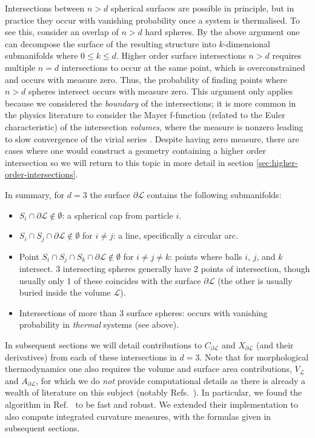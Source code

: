 \documentclass[11pt,twoside]{report}
\begin{document}
Intersections between $n > d$ spherical surfaces are possible in principle, but in practice they occur with vanishing probability once a system is thermalised.
To see this, consider an overlap of $n > d$ hard spheres.
By the above argument one can decompose the surface of the resulting structure into $k$-dimensional submanifolds where $0 \le k \le d$.
Higher order surface intersections $n>d$ requires multiple $n=d$ intersections to occur at the same point, which is overconstrained and occurs with measure zero.
Thus, the probability of finding points where $n > d$ spheres intersect occurs with measure zero.
This argument only applies because we considered the \emph{boundary} of the intersections; it is more common in the physics literature to consider the Mayer f-function (related to the Euler characteristic) of the intersection \emph{volumes}, where the measure is nonzero leading to slow convergence of the virial series \cite{Hansen2013}.
Despite having zero measure, there are cases where one would construct a geometry containing a higher order intersection so we will return to this topic in more detail in section \ref{sec:higher-order-intersections}.

In summary, for $d=3$ the surface $\partial\mathcal{L}$ contains the following submanifolds:
\begin{itemize}
\item $S_i \cap \partial\mathcal{L} \notin \emptyset$: a spherical cap from particle $i$.
\item $S_i \cap S_j \cap \partial\mathcal{L} \notin \emptyset$ for $i \ne j$: a line, specifically a circular arc.
\item Point $S_i \cap S_j \cap S_k \cap \partial\mathcal{L} \notin \emptyset$ for $i \ne j \ne k$: points where balls $i$, $j$, and $k$ intersect.
  3 intersecting spheres generally have 2 points of intersection, though usually only 1 of these coincides with the surface $\partial\mathcal{L}$ (the other is usually buried inside the volume $\mathcal{L}$).
\item Intersections of more than 3 surface spheres: occurs with vanishing probability in \emph{thermal} systems (see above).
\end{itemize}

In subsequent sections we will detail contributions to $C_{\partial\mathcal{L}}$ and $X_{\partial\mathcal{L}}$ (and their derivatives) from each of these intersections in $d=3$.
Note that for morphological thermodynamics one also requires the volume and surface area contributions, $V_\mathcal{L}$ and $A_{\partial\mathcal{L}}$, for which we do \emph{not} provide computational details as there is already a wealth of literature on this subject (notably Refs.\ \cite{EdelsbrunnerPNAS2003,BryantDCG2004}).
In particular, we found the algorithm in Ref.\ \cite{KleninJCC2011} to be fast and robust.
We extended their implementation to also compute integrated curvature measures, with the formulas given in subsequent sections.
\end{document}
